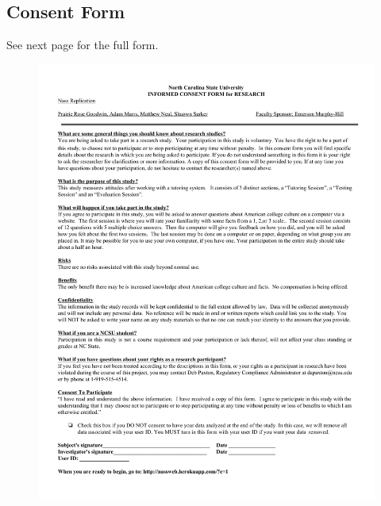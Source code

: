 \documentclass{sig-alternate-05-2015}
\begin{document}
\subsection{Consent Form}
See next page for the full form.
\begin{figure}[!h]
    \centering
    \includegraphics[width=\linewidth]{appendix/consent_form.pdf}
\end{figure}
\end{document}
